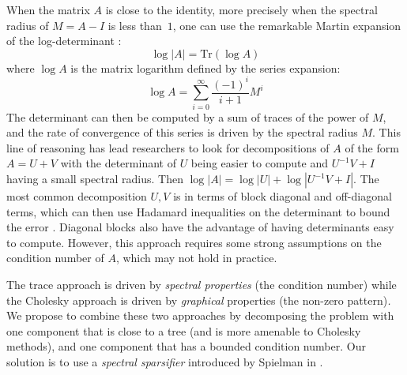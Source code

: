 When the matrix $A$ is close to the identity, more precisely when
the spectral radius of $M=A-I$ is less than~$1$, one can use the
remarkable Martin expansion of the log-determinant \cite{martin1992approximations}:
\begin{equation}
\log\left|A\right|=\text{Tr}\left(\log A\right)\label{eq:martin-expansion}
\end{equation}
where $\log A$ is the matrix logarithm defined by the series expansion:
\begin{equation}
\log A=\sum_{i=0}^{\infty}\frac{\left(-1\right)^{i}}{i+1}M^{i}\label{eq:matrix-log}
\end{equation}
The determinant can then be computed by a sum of traces of the power
of $M$, and the rate of convergence of this series is driven by the
spectral radius $M$. This line of reasoning has lead researchers
to look for decompositions of $A$ of the form $A=U+V$ with the determinant
of $U$ being easier to compute and $U^{-1}V+I$ having a small spectral
radius. Then $\log\left|A\right|=\log\left|U\right|+\log\left|U^{-1}V+I\right|$.
The most common decomposition $U,V$ is in terms of block diagonal
and off-diagonal terms, which can then use Hadamard inequalities on
the determinant to bound the error \cite{Ipsen2006}. Diagonal blocks
also have the advantage of having determinants easy to compute. However,
this approach requires some strong assumptions on the condition number
of $A$, which may not hold in practice.

The trace approach is driven by \emph{spectral properties }(the condition
number) while the Cholesky approach is driven by \emph{graphical }properties\emph{
}(the non-zero pattern)\emph{. }We\emph{ }propose to combine these
two approaches by decomposing the problem with one component that
is close to a tree (and is more amenable to Cholesky methods), and
one component that has a bounded condition number. Our solution is
to use a \emph{spectral sparsifier} introduced by Spielman in \cite{Spielman2008}.

